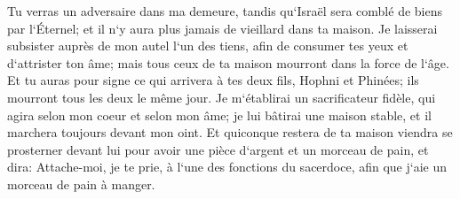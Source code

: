 \verse Tu verras un adversaire dans ma demeure, tandis qu`Israël sera comblé de biens par l`Éternel; et il n`y aura plus jamais de vieillard dans ta maison. 
\verse Je laisserai subsister auprès de mon autel l`un des tiens, afin de consumer tes yeux et d`attrister ton âme; mais tous ceux de ta maison mourront dans la force de l`âge. 
\verse Et tu auras pour signe ce qui arrivera à tes deux fils, Hophni et Phinées; ils mourront tous les deux le même jour. 
\verse Je m`établirai un sacrificateur fidèle, qui agira selon mon coeur et selon mon âme; je lui bâtirai une maison stable, et il marchera toujours devant mon oint. 
\verse Et quiconque restera de ta maison viendra se prosterner devant lui pour avoir une pièce d`argent et un morceau de pain, et dira: Attache-moi, je te prie, à l`une des fonctions du sacerdoce, afin que j`aie un morceau de pain à manger. 

\chapter{}

